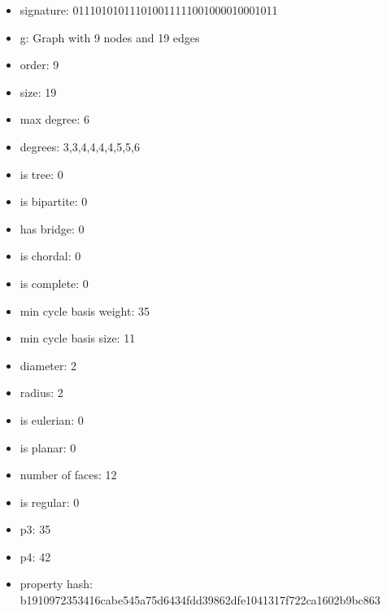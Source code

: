 \newpage
\begin{figure}
\end{figure}
\begin{itemize}
\item signature: 011101010111010011111001000010001011
\item g: Graph with 9 nodes and 19 edges
\item order: 9
\item size: 19
\item max degree: 6
\item degrees: 3,3,4,4,4,4,5,5,6
\item is tree: 0
\item is bipartite: 0
\item has bridge: 0
\item is chordal: 0
\item is complete: 0
\item min cycle basis weight: 35
\item min cycle basis size: 11
\item diameter: 2
\item radius: 2
\item is eulerian: 0
\item is planar: 0
\item number of faces: 12
\item is regular: 0
\item p3: 35
\item p4: 42
\item property hash: b1910972353416cabe545a75d6434fdd39862dfe1041317f722ca1602b9bc863
\end{itemize}
